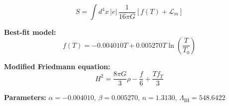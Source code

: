 
\begin{equation}
  S = \int d^4x \, |e| \, \frac{1}{16\pi G} \left[ f(T) + \mathcal{L}_m \right]
\end{equation}

\textbf{Best-fit model:}
\begin{equation}
  f(T) = -0.004010 T + 0.005270 T \ln\!\left(\frac{T}{T_0}\right)
\end{equation}

\textbf{Modified Friedmann equation:}
\begin{equation}
  H^2 = \frac{8\pi G}{3} \rho - \frac{f}{6} + \frac{T f_T}{3}
\end{equation}

\textbf{Parameters:}
$\alpha = -0.004010$, \quad
$\beta = 0.005270$, \quad
$n = 1.3130$, \quad
$\Lambda_{\text{BI}} = 548.6422$
